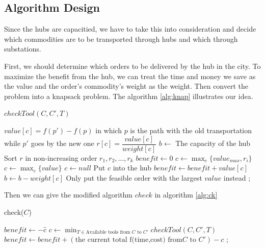 \documentclass[11pt, a4paper]{article} %
\begin{document}
\subsection{Algorithm Design}
	Since the hubs are capacitied, we have to take this into consideration and decide which commodities are to be transported 
	through hubs and which through substations. 
	
	First, we should determine which orders to be delivered by the hub in the city. To maximize the benefit from the hub, we can treat the time and money we save as the value and the order's commodity's weight as the weight. Then convert the problem into a knapsack problem. The algorithm \ref{alg:knap} illustrates our idea.
	
	\begin{algorithm}\label{alg:knap}
		\caption{$checkTool(C,C',T)$}
		\BlankLine
		{
			$value[c]=f(p')-f(p)$ in which $p$ is the path with the old transportation while $p'$ goes by the new one\;
			$r[c]=\dfrac{value[c]}{weight[c]}$\;
		}
		$b\leftarrow$ The capacity of the hub\;
		Sort $r$ in non-increasing order $r_1,r_2,\ldots,r_k$\;
		$benefit\leftarrow0$\;
		{
			{
				$c\leftarrow\max_c\{value_{max},r_i\}$\;
			}
			\Else
			{
				$c\leftarrow\max_c\{value\}$\;
				{
					$c\leftarrow null$\;
				}
			}
			Put $c$ into the hub\;
			$benefit\leftarrow benefit+value[c]$\;
			$b\leftarrow b-weight[c]$\;
		}
		{
			Only put the feasible order with the largest $value$ instead\;
		}
		;
	\end{algorithm}
	Then we can give the modified algorithm $check$ in algorithm \ref{alg:ck}
	\begin{algorithm}\label{alg:ck}
		\caption{check($C$)}
		\BlankLine
		$benefit\leftarrow-\hat{c}$\;
		{
			$c\leftarrow\min_{T\in\text{Available tools from }C\text{ to }C'}checkTool(C,C',T)$\;
			$benefit\leftarrow benefit+(\text{the current total f(time,cost) from}C\text{ to }C')-c$\;
		}
		;
	\end{algorithm}
\end{document}
